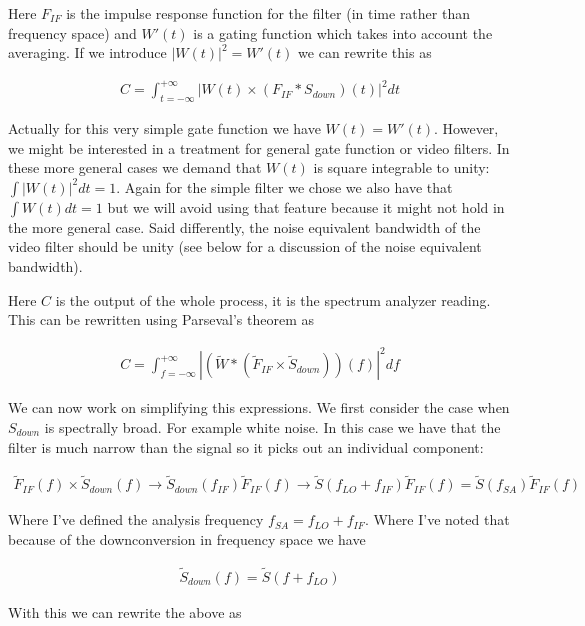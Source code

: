 \documentclass[12pt]{article}
\begin{document}
Here $F_{IF}$ is the impulse response function for the filter (in time rather than frequency space) and $W'(t)$ is a gating function which takes into account the averaging.
If we introduce $|W(t)|^2 = W'(t)$ we can rewrite this as

\begin{align}
C = \int_{t=-\infty}^{+\infty} \left|W(t) \times \left(F_{IF} \ast S_{down}\right)(t)\right|^2 dt
\end{align}

Actually for this very simple gate function we have $W(t) = W'(t)$.
However, we might be interested in a treatment for general gate function or video filters.
In these more general cases we demand that $W(t)$ is square integrable to unity: $\int |W(t)|^2 dt = 1$.
Again for the simple filter we chose we also have that $\int W(t) dt=1$ but we will avoid using that feature because it might not hold in the more general case.
Said differently, the noise equivalent bandwidth of the video filter should be unity (see below for a discussion of the noise equivalent bandwidth).

Here $C$ is the output of the whole process, it is the spectrum analyzer reading.
This can be rewritten using Parseval's theorem as

\begin{align}
C= \int_{f=-\infty}^{+\infty} \left|\left(\tilde{W} \ast \left(\tilde{F}_{IF} \times \tilde{S}_{down}\right)\right)(f)\right|^2 df
\end{align}

We can now work on simplifying this expressions. We first consider the case when $S_{down}$ is spectrally broad. 
For example white noise.
In this case we have that the filter is much narrow than the signal so it picks out an individual component:

\begin{align}
\tilde{F}_{IF}(f) \times \tilde{S}_{down}(f)\rightarrow \tilde{S}_{down}(f_{IF})\tilde{F}_{IF}(f) \rightarrow \tilde{S}(f_{LO} + f_{IF}) \tilde{F}_{IF}(f) = \tilde{S}(f_{SA})\tilde{F}_{IF}(f)
\end{align}

Where I've defined the analysis frequency $f_{SA} = f_{LO} + f_{IF}$.
Where I've noted that because of the downconversion in frequency space we have

\begin{align}
\tilde{S}_{down}(f) = \tilde{S}(f+f_{LO})
\end{align}

With this we can rewrite the above as
\end{document}
